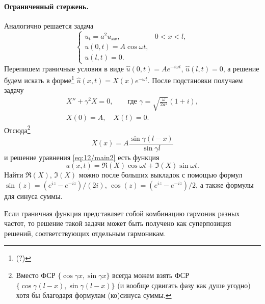 \paragraph{Ограниченный стержень.}
Аналогично решается задача  
\begin{equation}
  \label{eq:12/main2}
  \begin{cases}
    u_t = a^2 u_{xx}, & 0 < x < l,\\
    u(0, t) = A\cos\omega t,\\
    u(l, t) = 0.
  \end{cases}
\end{equation}
Перепишем граничные условия в виде $ \hat u(0, t) = Ae^{-i\omega t} $, $ \hat
u(l, t) = 0 $, а решение будем искать в форме\footnote{(?)} $ \hat u(x, t) =
X(x)e^{-\omega t} $. После подстановки получаем задачу
\begin{gather*}
  X'' + \gamma^2X =0,\qquad \text{где }\gamma = \sqrt{
  \frac{\omega}{2a^2}}(1+i),\\
  X(0) = A,\quad
  X(l) = 0.
\end{gather*}
Отсюда\footnote{Вместо ФСР $ \{\cos \gamma x, \sin \gamma x\} $ всегда можем
взять ФСР $ \{\cos\gamma(l-x), \sin\gamma(l-x)\} $ (и вообще сдвигать фазу как
душе угодно) хотя бы благодаря формулам
(ко)синуса суммы.}
\[
    X(x) = A \frac{\sin\gamma(l-x)}{\sin\gamma l}
\]
и решение уравнения \eqref{eq:12/main2} есть функция 
\[
  u(x, t) = \Re(X)\cos\omega t + \Im(X)\sin\omega t.
\]
Найти $ \Re (X) $, $ \Im(X) $ можно после больших выкладок с помощью формул $
\sin(z) = (e^{iz} - e^{-iz})/(2i) $, $ \cos(z)= (e^{iz} - e^{-iz})/2$, а также
формулы для синуса суммы.



Если граничная функция представляет собой комбинацию 
гармоник разных частот, то решение такой задачи может быть получено как
суперпозиция решений, соответствующих отдельным гармоникам.
